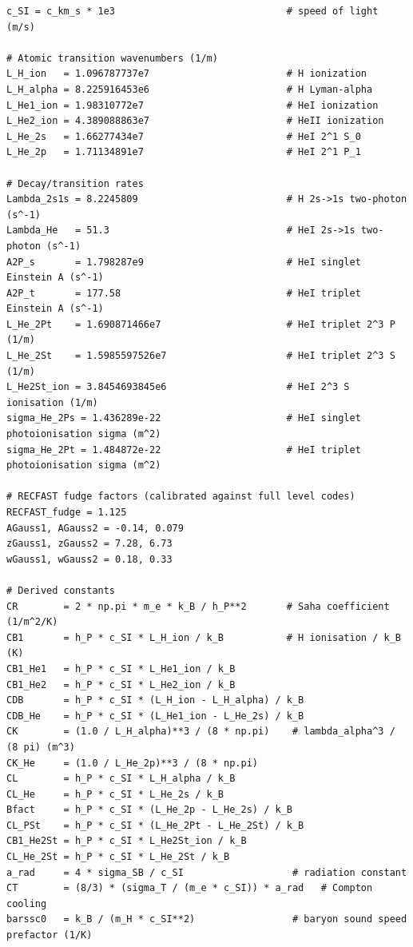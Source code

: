\begin{codebox}
\begin{lstlisting}[style=python]
c_SI = c_km_s * 1e3                              # speed of light (m/s)

# Atomic transition wavenumbers (1/m)
L_H_ion   = 1.096787737e7                        # H ionization
L_H_alpha = 8.225916453e6                        # H Lyman-alpha
L_He1_ion = 1.98310772e7                         # HeI ionization
L_He2_ion = 4.389088863e7                        # HeII ionization
L_He_2s   = 1.66277434e7                         # HeI 2^1 S_0
L_He_2p   = 1.71134891e7                         # HeI 2^1 P_1

# Decay/transition rates
Lambda_2s1s = 8.2245809                          # H 2s->1s two-photon (s^-1)
Lambda_He   = 51.3                               # HeI 2s->1s two-photon (s^-1)
A2P_s       = 1.798287e9                         # HeI singlet Einstein A (s^-1)
A2P_t       = 177.58                             # HeI triplet Einstein A (s^-1)
L_He_2Pt    = 1.690871466e7                      # HeI triplet 2^3 P (1/m)
L_He_2St    = 1.5985597526e7                     # HeI triplet 2^3 S (1/m)
L_He2St_ion = 3.8454693845e6                     # HeI 2^3 S ionisation (1/m)
sigma_He_2Ps = 1.436289e-22                      # HeI singlet photoionisation sigma (m^2)
sigma_He_2Pt = 1.484872e-22                      # HeI triplet photoionisation sigma (m^2)

# RECFAST fudge factors (calibrated against full level codes)
RECFAST_fudge = 1.125
AGauss1, AGauss2 = -0.14, 0.079
zGauss1, zGauss2 = 7.28, 6.73
wGauss1, wGauss2 = 0.18, 0.33

# Derived constants
CR        = 2 * np.pi * m_e * k_B / h_P**2       # Saha coefficient (1/m^2/K)
CB1       = h_P * c_SI * L_H_ion / k_B           # H ionisation / k_B (K)
CB1_He1   = h_P * c_SI * L_He1_ion / k_B
CB1_He2   = h_P * c_SI * L_He2_ion / k_B
CDB       = h_P * c_SI * (L_H_ion - L_H_alpha) / k_B
CDB_He    = h_P * c_SI * (L_He1_ion - L_He_2s) / k_B
CK        = (1.0 / L_H_alpha)**3 / (8 * np.pi)    # lambda_alpha^3 / (8 pi) (m^3)
CK_He     = (1.0 / L_He_2p)**3 / (8 * np.pi)
CL        = h_P * c_SI * L_H_alpha / k_B
CL_He     = h_P * c_SI * L_He_2s / k_B
Bfact     = h_P * c_SI * (L_He_2p - L_He_2s) / k_B
CL_PSt    = h_P * c_SI * (L_He_2Pt - L_He_2St) / k_B
CB1_He2St = h_P * c_SI * L_He2St_ion / k_B
CL_He_2St = h_P * c_SI * L_He_2St / k_B
a_rad     = 4 * sigma_SB / c_SI                   # radiation constant
CT        = (8/3) * (sigma_T / (m_e * c_SI)) * a_rad   # Compton cooling
barssc0   = k_B / (m_H * c_SI**2)                 # baryon sound speed prefactor (1/K)
\end{lstlisting}
\end{codebox}

